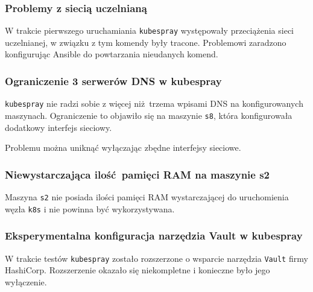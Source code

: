 \documentclass[a4paper,12pt,twoside,openany]{report}
\newcommand{\passthrough}[1]{#1}
\begin{document}
\hypertarget{problemy-z-sieciux105-uczelnianux105}{%
\subsubsection{Problemy z siecią
uczelnianą}\label{problemy-z-sieciux105-uczelnianux105}}

W trakcie pierwszego uruchamiania \passthrough{\lstinline!kubespray!}
występowały przeciążenia sieci uczelnianej, w związku z tym komendy były
tracone. Problemowi zaradzono konfigurując Ansible do powtarzania
nieudanych komend.

\hypertarget{ograniczenie-3-serweruxf3w-dns-w-kubespray}{%
\subsubsection{Ograniczenie 3 serwerów DNS w
kubespray}\label{ograniczenie-3-serweruxf3w-dns-w-kubespray}}

\passthrough{\lstinline!kubespray!} nie radzi sobie z więcej niż~trzema
wpisami DNS na konfigurowanych maszynach. Ograniczenie to objawiło się
na maszynie \passthrough{\lstinline!s8!}, która konfigurowała dodatkowy
interfejs sieciowy.

Problemu można uniknąć wyłączając zbędne interfejsy sieciowe.

\hypertarget{niewystarczajux105ca-iloux15bux107pamiux119ci-ram-na-maszynie-s2}{%
\subsubsection{Niewystarczająca ilość~pamięci RAM na maszynie
s2}\label{niewystarczajux105ca-iloux15bux107pamiux119ci-ram-na-maszynie-s2}}

Maszyna \passthrough{\lstinline!s2!} nie posiada ilości pamięci RAM
wystarczającej do uruchomienia węzła \passthrough{\lstinline!k8s!} i nie
powinna być wykorzystywana.

\hypertarget{eksperymentalna-konfiguracja-narzux119dzia-vault-w-kubespray}{%
\subsubsection{Eksperymentalna konfiguracja narzędzia Vault w
kubespray}\label{eksperymentalna-konfiguracja-narzux119dzia-vault-w-kubespray}}

W trakcie testów \passthrough{\lstinline!kubespray!} zostało rozszerzone
o wsparcie narzędzia \passthrough{\lstinline!Vault!} firmy HashiCorp.
Rozszerzenie okazało się niekompletne i konieczne było jego wyłączenie.
\end{document}
